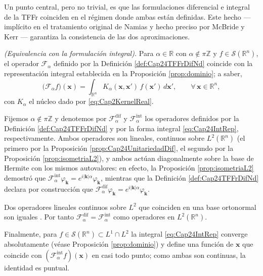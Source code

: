             Un punto central, pero no trivial, es que las formulaciones diferencial e integral de la TFFr coinciden en el régimen donde ambas están definidas. Este hecho --- implícito en el tratamiento original de Namias y hecho preciso por McBride y Kerr --- garantiza la consistencia de las dos aproximaciones.

            \begin{proposition}\label{prop:Cap24EquivDifInt}
                \textit{(Equivalencia con la formulación integral).} Para $\alpha \in \mathbb{R}$ con $\alpha \notin \pi\mathbb{Z}$ y $f \in \mathcal{S}(\mathbb{R}^n)$, el operador $\mathcal{F}_\alpha$ definido por la Definición \ref{def:Cap24TFFrDifNd} coincide con la representación integral establecida en la Proposición \ref{prop:dominio}; a saber,
                \begin{equation}\label{eq:Cap24IntRep}
                    \big(\mathcal{F}_\alpha f\big)(\mathbf{x}) = \int_{\mathbb{R}^n} K_\alpha(\mathbf{x},\mathbf{x}')\,f(\mathbf{x}')\,d\mathbf{x}',\qquad \forall\,\mathbf{x}\in\mathbb{R}^n,
                \end{equation}
                con $K_\alpha$ el núcleo dado por \eqref{eq:Cap2KernelReal}.
            \end{proposition}
            \begin{Proof}
                Fijemos $\alpha \notin \pi\mathbb{Z}$ y denotemos por $\mathcal{F}_\alpha^{\mathrm{dif}}$ y $\mathcal{F}_\alpha^{\mathrm{int}}$ los operadores definidos por la Definición \ref{def:Cap24TFFrDifNd} y por la forma integral \eqref{eq:Cap24IntRep}, respectivamente. Ambos operadores son lineales, continuos sobre $L^2(\mathbb{R}^n)$ (el primero por la Proposición \ref{prop:Cap24UnitariedadDif}, el segundo por la Proposición \ref{prop:isometriaL2}), y ambos actúan diagonalmente sobre la base de Hermite con los mismos autovalores: en efecto, la Proposición \ref{prop:isometriaL2} demostró que $\mathcal{F}_\alpha^{\mathrm{int}}\varphi_{\boldsymbol{k}} = e^{i|\boldsymbol{k}|\alpha}\varphi_{\boldsymbol{k}}$, mientras que la Definición \ref{def:Cap24TFFrDifNd} declara por construcción que $\mathcal{F}_\alpha^{\mathrm{dif}}\varphi_{\boldsymbol{k}} = e^{i|\boldsymbol{k}|\alpha}\varphi_{\boldsymbol{k}}$.

                Dos operadores lineales continuos sobre $L^2$ que coinciden en una base ortonormal son iguales \citep[Thm. II.6]{reed1980methods}. Por tanto $\mathcal{F}_\alpha^{\mathrm{dif}} = \mathcal{F}_\alpha^{\mathrm{int}}$ como operadores en $L^2(\mathbb{R}^n)$.

                Finalmente, para $f\in \mathcal{S}(\mathbb{R}^n)\subset L^1\cap L^2$ la integral \eqref{eq:Cap24IntRep} converge absolutamente (véase Proposición \ref{prop:dominio}) y define una función de $\mathbf{x}$ que coincide con $(\mathcal{F}_\alpha^{\mathrm{int}} f)(\mathbf{x})$ en casi todo punto; como ambas son continuas, la identidad es puntual.
            \end{Proof}


